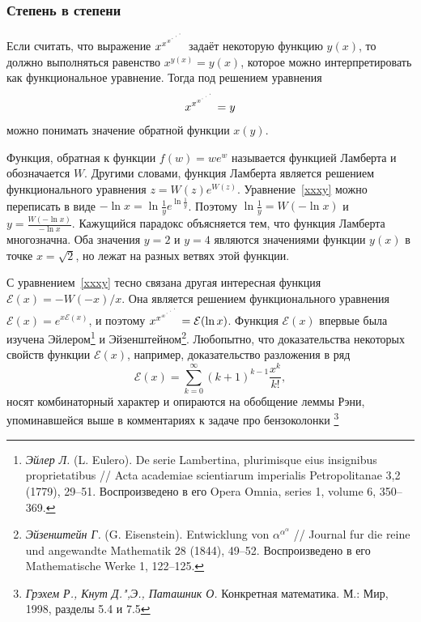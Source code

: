 \documentclass[twoside]{book}
\begin{document}
\subsubsection*{Степень в степени} %
Если считать, что выражение $x^{x^{ x^{{\cdot}^{\mkern2.5mu\cdot^{\mkern2.5mu\cdot}}}}}$ задаёт некоторую функцию $y(x)$, то должно выполняться равенство $x^{y(x)}=y(x)$, которое можно интерпретировать как функциональное уравнение. Тогда под решением  
уравнения 
\begin{equation}
\label{xxxy}
x^{x^{ x^{{\cdot}^{\mkern2.5mu\cdot^{\mkern2.5mu\cdot}}}}}=y
\end{equation}
можно понимать значение обратной функции $x(y).$

Функция,  обратная к функции $f(w)=we^w$  называется функцией Ламберта и обозначается $W$. Другими словами,  функция Ламберта является решением функционального уравнения $z=W(z)e^{W(z)}.$ Уравнение~\eqref{xxxy} можно переписать в виде $-\ln x=\ln\frac{1}{y }e^{\ln\frac{1}{y }}$. Поэтому $\ln\frac{1}{y }=W(-\ln x)$
и
$y=\frac{W(-\ln x)}{ -\ln x}$.
Кажущийся парадокс объясняется тем, что  функция Ламберта многозначна.  Оба значения  $y=2$ и $y=4$ являются значениями функции $y(x)$ в точке $x=\sqrt{2}$, но лежат на разных ветвях этой функции. 

С уравнением~\eqref{xxxy} тесно связана другая интересная функция
$\mathcal{E}(x)=-W(-x)/x$. Она является решением функционального уравнения
$\mathcal{E}(x)=e^{x\mathcal{E}(x)}$, и поэтому $x^{x^{ x^{{\cdot}^{\mkern2.5mu\cdot^{\mkern2.5mu\cdot}}}}}=\mathcal{E}(\ln x)$. Функция $\mathcal{E}(x)$ впервые была изучена Эйлером\footnote{%
\emph{Эйлер Л.} (L. Eulero). De serie Lambertina, plurimisque eius 
insignibus proprietatibus /\!/ Acta academiae scientiarum imperialis 
Petropolitanae 3,2 (1779), 29--51. Воспроизведено в его Opera 
Omnia, series 1, volume 6, 350--369.}
и Эйзенштейном\footnote{%
\emph{Эйзенштейн Г.} (G. Eisenstein). Entwicklung von $\alpha^{\alpha^{\alpha}}$ /\!/ Journal 
fur die reine und angewandte Mathematik 28 (1844), 49--52. 
Воспроизведено в его Mathematische Werke 1, 122--125.}. 
Любопытно, что доказательства некоторых свойств функции $\mathcal{E}(x)$, например, доказательство разложения в ряд
$$\mathcal{E}(x)=\sum_{k=0}^{\infty}(k+1)^{k-1}\frac{x^k}{ k!},$$
носят комбинаторный характер и опираются на обобщение леммы Рэни, упоминавшейся выше в комментариях к задаче про бензоколонки%
\footnote{\emph{Грэхем Р., Кнут Д.",Э., Паташник О.} Конкретная математика. М.: Мир, 1998, разделы 5.4 и 7.5}
\end{document}
